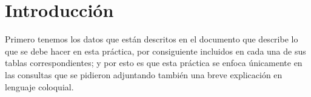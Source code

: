 \documentclass[titlepage,a4paper]{article}
\theoremstyle{definition}
\theoremstyle{remark}
\begin{document}
    
   
  \tableofcontents{}
  \newpage{} %
\section{Introducción}
Primero tenemos los datos que están descritos en el documento que describe lo que se debe hacer en esta práctica, por consiguiente incluidos en cada una de sus tablas correspondientes; y por esto es que esta práctica se enfoca únicamente en las consultas que se pidieron adjuntando también una breve explicación en lenguaje coloquial.
\end{document}
